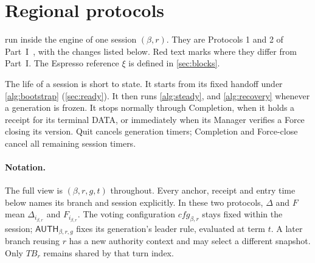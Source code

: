 \documentclass[11pt,a4paper]{article}
\newcommand{\RR}[1]{{\color{rrRed}#1}}
\newcommand{\TB}{\mathit{TB}}
\newcommand{\tagg}[1]{\ensuremath{\mathsf{#1}}}
\newcounter{protocol}
\begin{document}
\section{Regional protocols}
\label{sec:protocols}
 run inside the engine of one session
$(\beta,r)$. They are Protocols 1 and 2 of Part~I~\cite{part1}, with the
changes listed below. \RR{Red text} marks where they differ from Part~I.
The Espresso reference $\xi$ is defined in \cref{sec:blocks}.

The life of a session is short to state. It starts from its fixed
handoff under \cref{alg:bootstrap} (\cref{sec:ready}). It then runs
\cref{alg:steady}, and \cref{alg:recovery} whenever a generation is
frozen. It stops normally through Completion, when it holds a receipt
for its terminal DATA, or immediately when its Manager verifies a Force
closing its version. Quit cancels generation timers; Completion and
Force-close cancel all remaining session timers.

\paragraph{Notation.}
The full view is $(\beta,r,g,t)$ throughout. Every anchor, receipt and
entry time below names its branch and session explicitly. In these two
protocols, $\Delta$ and $F$ mean $\Delta_{i_{\beta,r}}$ and
$F_{i_{\beta,r}}$. The voting configuration $\mathit{cfg}_{\beta,r}$ stays
fixed within the session; $\tagg{AUTH}_{\beta,r,g}$ fixes its generation's
leader rule, evaluated at term $t$. A later branch reusing $r$ has a new
authority context and may select a different snapshot. Only $\TB_r$
remains shared by that turn index.
\end{document}
